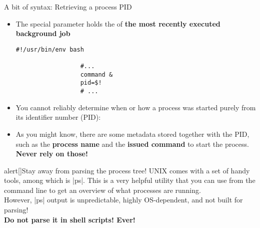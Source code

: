 \begin{frame}[fragile]{A bit of syntax: Retrieving a process PID}
    \vspace{-3mm}
    \begin{itemize}
        \item The \PB{\texttt{\$!}} special parameter holds the  of \textbf{the most recently executed background job}
              \begin{lstlisting}[style=MyBash, numbers=none, aboveskip=2mm, belowskip=-5mm, xrightmargin=25mm]
                  #!/usr/bin/env bash

                  #...
                  command &
                  pid=$!
                  # ...
              \end{lstlisting}
        \item You cannot reliably determine when or how a process was started purely from its identifier number (PID): 
        \item As you might know, there are some metadata stored together with the PID, such as the \textbf{process name} and the \textbf{issued command} to start the process. \alert{\textbf{Never rely on those!}}
    \end{itemize}
    \vspace{-1mm}
    \begin{varblock}{alert}[\textwidth]{Stay away from parsing the process tree!}
        UNIX comes with a set of handy tools, among which is \bash|ps|.
        This is a very helpful utility that you can use from the command line to get an overview of what processes are running.\\
        \alert{However, \bash|ps| output is unpredictable, highly OS-dependent, and not built for parsing!\\\textbf{Do not parse it in shell scripts! Ever!}}
    \end{varblock}
\end{frame}
